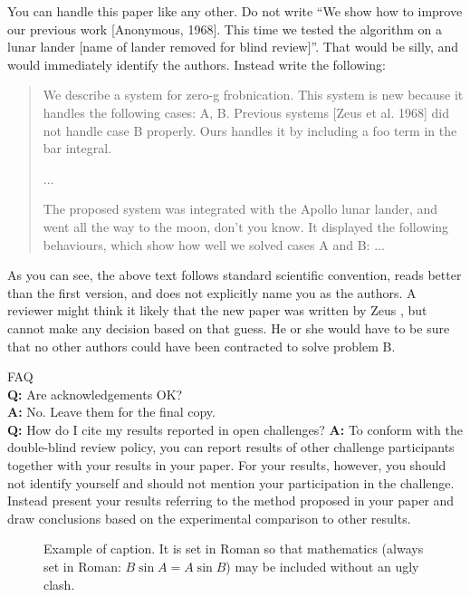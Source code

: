 \documentclass[10pt,twocolumn,letterpaper]{article}
\begin{document}
You can handle this paper like any other.
Do not write ``We show how to improve our previous work [Anonymous, 1968].
This time we tested the algorithm on a lunar lander [name of lander removed for blind review]''.
That would be silly, and would immediately identify the authors.
Instead write the following:
\begin{quotation}
\noindent
   We describe a system for zero-g frobnication.
   This system is new because it handles the following cases:
   A, B.  Previous systems [Zeus et al. 1968] did not  handle case B properly.
   Ours handles it by including a foo term in the bar integral.

   ...

   The proposed system was integrated with the Apollo lunar lander, and went all the way to the moon, don't you know.
   It displayed the following behaviours, which show how well we solved cases A and B: ...
\end{quotation}
As you can see, the above text follows standard scientific convention, reads better than the first version, and does not explicitly name you as the authors.
A reviewer might think it likely that the new paper was written by Zeus \etal, but cannot make any decision based on that guess.
He or she would have to be sure that no other authors could have been contracted to solve problem B.
\medskip

\noindent
FAQ\medskip\\
{\bf Q:} Are acknowledgements OK?\\
{\bf A:} No.  Leave them for the final copy.\medskip\\
{\bf Q:} How do I cite my results reported in open challenges?
{\bf A:} To conform with the double-blind review policy, you can report results of other challenge participants together with your results in your paper.
For your results, however, you should not identify yourself and should not mention your participation in the challenge.
Instead present your results referring to the method proposed in your paper and draw conclusions based on the experimental comparison to other results.\medskip\\

\begin{figure}[t]
  \centering
  \fbox{\rule{0pt}{2in} \rule{0.9\linewidth}{0pt}}

   \caption{Example of caption.
   It is set in Roman so that mathematics (always set in Roman: $B \sin A = A \sin B$) may be included without an ugly clash.}
   \label{fig:onecol}
\end{figure}
\end{document}
